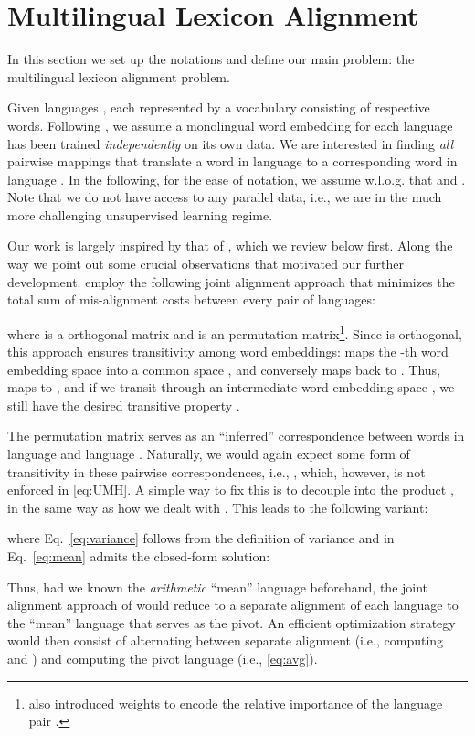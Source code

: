 \documentclass{article}
\begin{document}
  \section{Multilingual Lexicon Alignment}
\label{sec:bg}
In this section we set up the notations and define our main problem: the multilingual lexicon alignment problem.

Given  languages , each represented by a vocabulary  consisting of  respective words. Following \citet{MikolovLS13}, we assume a monolingual word embedding  for each language  has been trained \emph{independently} on its own data. We are interested in finding \emph{all} pairwise mappings  that translate a word  in language  to a corresponding word  in language . In the following, for the ease of notation, we assume w.l.o.g. that  and . Note that we do not have access to any parallel data, i.e., we are in the much more challenging unsupervised learning regime.

Our work is largely inspired by that of \citet{AlauxGCJ19}, which we review below first. Along the way we point out some crucial observations that motivated our further development. \citet{AlauxGCJ19} employ the following joint alignment approach that  minimizes the total sum of mis-alignment costs between every pair of languages: 

where  is a  orthogonal matrix and  is an  permutation matrix\footnote{\citet{AlauxGCJ19} also introduced weights   to encode the relative importance of the language pair .}. Since  is orthogonal, this approach ensures transitivity among word embeddings:  maps the -th word embedding space  into a common space , and conversely  maps  back to . Thus,  maps  to , and if we transit through an intermediate word embedding space , we still have the desired transitive property .

The permutation matrix  serves as an ``inferred'' correspondence between words in language  and language . Naturally, we would again expect some form of transitivity in these pairwise correspondences, i.e., , which, however, is not enforced in \eqref{eq:UMH}. A simple way to fix this is to decouple  into the product , in the same way as how we dealt with . This leads to the following variant:

where Eq.~\ref{eq:variance} follows from the definition of variance and  in Eq.~\ref{eq:mean}  admits the closed-form solution:

Thus, had we known the \emph{arithmetic} ``mean'' language  beforehand, the joint alignment approach of \citet{AlauxGCJ19} would reduce to a separate alignment of each language  to the ``mean'' language  that serves as the pivot. An efficient optimization strategy would then consist of alternating between separate alignment (i.e., computing  and ) and computing the pivot language (i.e., \eqref{eq:avg}).
\end{document}
